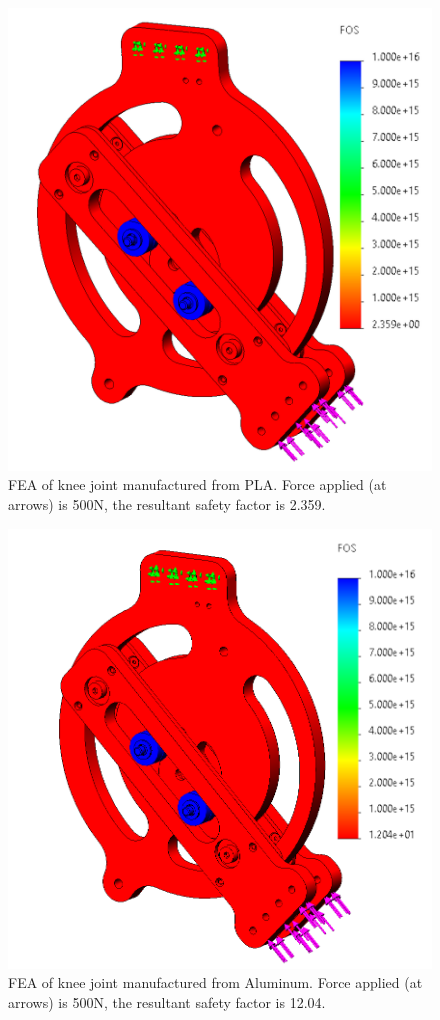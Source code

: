 \begin{figure}[ht!]
    \centering
    \includegraphics[width=0.8\linewidth]{Figures/Design/FEA_PLA_45deg.png}
    \caption{FEA of knee joint manufactured from PLA. Force applied (at arrows) is 500N, the resultant safety factor is 2.359.}
    \label{fig:FEA_PLA}
\end{figure}

\begin{figure}[ht!]
    \centering
    \includegraphics[width=0.8\linewidth]{Figures/Design/FEA_AL_45deg.png}
    \caption{FEA of knee joint manufactured from Aluminum. Force applied (at arrows) is 500N, the resultant safety factor is 12.04.}
    \label{fig:FEA_AL}
\end{figure}

